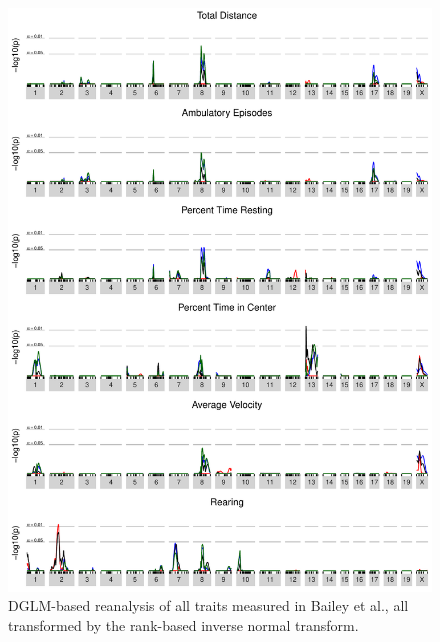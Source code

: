         \newpage
        \begin{figure}
            \includegraphics[height=0.9\textheight]{images/bailey_scans_rint.pdf}
            \caption{DGLM-based reanalysis of all traits measured in Bailey et al., all transformed by the rank-based inverse normal transform.}
            \label{fig:Bailey_rint_scans}
        \end{figure}

